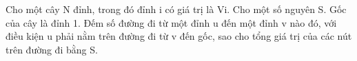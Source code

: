 Cho một cây N đỉnh, trong đó đỉnh i có giá trị là Vi. Cho một số nguyên S. Gốc của cây là đỉnh 1. Đếm số đường đi từ một đỉnh u đến một đỉnh v nào đó, với điều kiện u phải nằm trên đường đi từ v đến gốc, sao cho tổng giá trị của các nút trên đường đi bằng S.